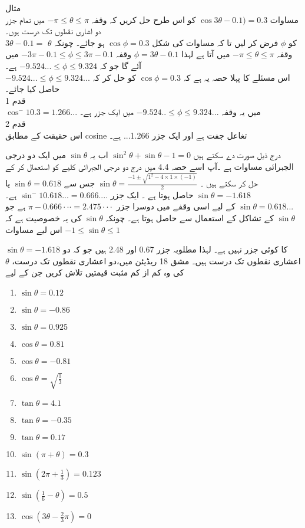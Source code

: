 مثال \\
مساوات 
\(\cos3\theta-0.1)=0.3\) 
کو اس طرح حل کریں کہ وقفہ
\(-\pi \le\theta \le \pi\)
میں تمام جزر دو اشاری نقطوں تک درست ہوں۔ \\
\(3\theta -0.1 =\)
کو 
\(\phi\)
فرض کر لیں تا کہ مساوات کی شکل 
\(\cos\phi=0.3\)
ہو جائے۔ چونکہ 
\(\theta\)
وقفہ 
\(-\pi \le\theta \le \pi\)
میں آتا ہے لہذا 
\(\phi=3\theta-0.1\)
وقفہ
\(-3\pi-0.1\le\phi\le3\pi-0.1\)   
میں آئے گا جو کہ
\(-9.524...\le\phi\le9.324\)
ہے۔ \\
اس مسئلے کا پہلا حصہ یہ ہے کہ
\(\cos\phi=0.3\)
کو حل کر کہ
\(-9.524...\le\phi\le9.324...\)
حاصل کیا جائے۔ \\
قدم 1\\
\(\cos^-1 0.3= 1.266...\) 
میں یہ وقفہ
\(-9.524..\le\phi\le9.324...\)
میں ایک جزر ہے۔ \\
قدم 2\\
اس حقیقت کے مطابق cosine تغاعل جفت ہے اور ایک جزر
1.266...
ہے۔



درج ذیل صورت دے سکتے ہیں 
\(\sin^2\theta+\sin\theta-1=0\)
اب یہ 
\(\sin\theta\)
میں ایک دو درجی الجبرائی مساوات ہے ۔آپ اسے حصہ 
4.4
میں درج دو درجی الجبرائی کلیے کو استعمال کر کے حل کر سکتے ہیں ۔
\(\sin\theta=\frac{-1\pm\sqrt{1^2-4\times 1 \times(-1)}}{2}\)
جس سے 
\(\sin\theta=0.618\)
یا
\(\sin\theta=-1.618\)
حاصل ہوتا ہے ۔
ایک جزر 
\(\sin^-1 0.618...=0.666....\) 
ہے۔
\(\sin\theta =0.618...\)
کے لیے اسی وقفے میں دوسرا جزر 
\(\pi-0.666\cdot\cdot\cdot=2.475\cdot\cdot\cdot\)
ہے جو 
\(\sin\theta\)
کے تشاکل کے استعمال سے حاصل ہوتا ہے۔
چونکہ 
\(\sin\theta\)
کی یہ خصوصیت ہے کہ 
\(-1 \le \sin \theta\le1\)
اس لیے مساوات 

\(\sin\theta=-1.618\)
کا کوئی جزر نہیں ہے۔
لہذا مطلوبہ جزر 
0.67
اور 
2.48
ہیں جو کہ دو اعشاری نقطوں تک درست ہیں۔
مشق 18
ریڈیئن میں،دو اعشاری نقطوں تک درست،
\(\theta\)
کی وہ کم از کم مثبت قیمتیں تلاش کریں جن کے لیے 
\begin{enumerate}
\item
\( \sin\theta= 0.12\)
\item
 \(\sin\theta = -0.86\)
\item
\( \sin\theta = 0.925\)
\item
\( \cos\theta = 0.81\)
\item
\( \cos \theta = -0.81\)
\item
\( \cos \theta =\sqrt{\frac{1}{3}}\)
\item
 \(\tan\theta = 4.1\)
\item
 \(\tan\theta =-0.35\)
\item
 \(\tan\theta = 0.17\)
\item
 \(\sin(\pi+\theta)=0.3\)
\item
 \(\sin(2\pi+\frac{1}{3})=0.123\)
\item
 \(\sin(\frac{1}{6}-\theta)=0.5\)
\item
 \(\cos(3\theta-\frac{2}{3}\pi)=0\)
\end{enumerate}

